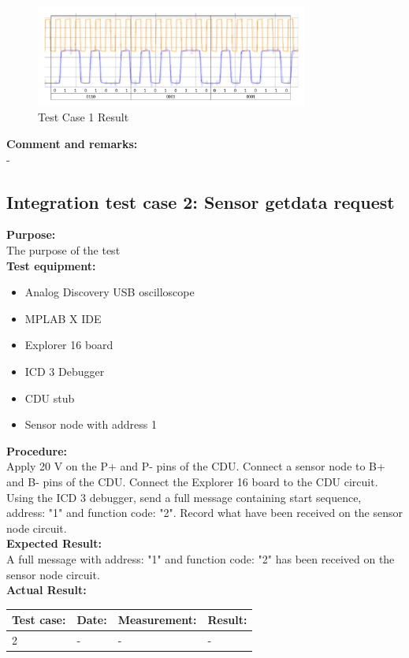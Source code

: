 \begin{figure}[H]
\centering
\includegraphics[width=0.8\textwidth]{billeder/CDUtestcase9}
\caption{Test Case 1 Result}
\label{fig:InteTestCase1}
\end{figure}

\textbf{Comment and remarks:}\\
-\\

\subsection{Integration test case 2: Sensor getdata request}
\textbf{Purpose:}\\
The purpose of the test\\

\textbf{Test equipment:}
\begin{itemize}
\item Analog Discovery USB oscilloscope
\item MPLAB X IDE
\item Explorer 16 board
\item ICD 3 Debugger
\item CDU stub
\item Sensor node with address 1
\end{itemize}

\textbf{Procedure:}\\
Apply 20 V on the P+ and P- pins of the CDU. Connect a sensor node to B+ and B- pins of the CDU. Connect the Explorer 16 board to the CDU circuit. Using the ICD 3 debugger, send a full message containing start sequence, address: "1" and function code: "2". Record what have been received on the sensor node circuit.\\

\textbf{Expected Result:}\\
A full message with address: "1" and function code: "2" has been received on the sensor node circuit.\\

\textbf{Actual Result:}\\
\begin{table}[H]
\centering
\begin{tabular}{|p{2cm}|p{2cm}|p{3cm}|p{2cm}|}\hline
\textbf{Test case:} & \textbf{Date:} & \textbf{Measurement:} & \textbf{Result:} \\ \hline
2 & - & - & - \\ \hline
\end{tabular}
\end{table}


